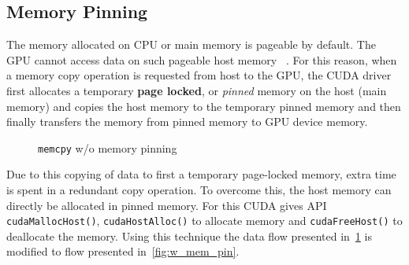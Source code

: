\subsection{Memory Pinning}\label{memory_pinning}
The memory allocated on CPU or main memory is pageable by default. The GPU cannot
access data on such pageable host memory~\cite{datatransferoptimization}
\cite{programmingguidecuda}. For this reason, when a memory copy operation is requested
from host to the GPU, the CUDA driver first allocates a temporary \textbf{page locked},
or \textit{pinned} memory on the host (main memory) and copies the host memory to the
temporary pinned memory and then finally transfers the memory from pinned memory
to GPU device memory.
\begin{figure}[h] %
  \caption{\texttt{memcpy} w/o memory pinning}\label{fig:wo_mem_pin}
\end{figure}

Due to this copying of data to first a temporary page-locked memory, extra time
is spent in a redundant copy operation. To overcome this, the host memory can directly
be allocated in pinned memory. For this CUDA gives API \texttt{cudaMallocHost()},
\texttt{cudaHostAlloc()} to allocate memory and \texttt{cudaFreeHost()} to deallocate
the memory. Using this technique the data flow presented in~\ref{fig:wo_mem_pin} is
modified to flow presented in~\ref{fig:w_mem_pin}.

